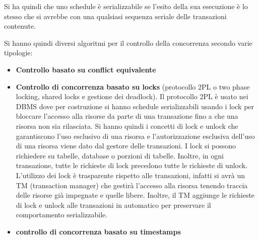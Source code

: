 Si ha quindi che uno schedule è serializzabile se l'esito della sua esecuzione è
lo stesso che si avrebbe con una qualsiasi sequenza seriale delle transazioni
contenute.

Si hanno quindi diversi algoritmi per il controllo della concorrenza secondo
varie tipologie:
\begin{itemize}
      \item \textbf{Controllo basato su conflict equivalente}
      \item \textbf{Controllo di concorrenza basato su locks} (protocollo 2PL o two
            phase locking, shared locks e gestione dei deadlock). Il protocollo
            2PL è usato nei DBMS dove per costruzione si hanno schedule
            serializzabili usando i lock per bloccare l'accesso alla risorse da
            parte di una transazione fino a che una risorsa non sia rilasciata.
            Si hanno quindi i concetti di lock e unlock che garantiscono l'uso
            esclusivo di una risorsa e l'autorizzazione esclusiva dell'uso di una
            risorsa viene dato dal gestore delle transazioni. I lock si possono
            richiedere su tabelle, database o porzioni di tabelle.
            Inoltre, in ogni transazione, tutte le richieste di lock precedono tutte
            le richieste di unlock. L'utilizzo dei lock è trasparente rispetto alle
            transazioni, infatti si avrà un TM (transaction manager) che gestirà
            l'accesso alla risorsa tenendo traccia delle risorse già impegnate e quelle
            libere. Inoltre, il TM aggiunge le richieste di lock e unlock alle
            transazioni in automatico per preservare il comportamento serializzabile.
      \item \textbf{controllo di concorrenza basato su timestamps}
\end{itemize}